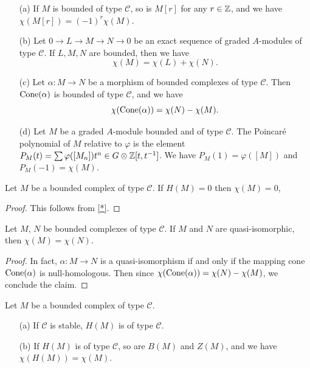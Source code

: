 \begin{example}
\mbox{}
\begin{itemize}
\item[(a)] If $M$ is bounded of type $\mathscr{C}$, so is $M[r]$ for any $r\in\mathbb{Z}$, and we have $\chi(M[r])=(-1)^r\chi(M)$.
\item[(b)] Let $0\to L\to M\to N\to 0$ be an exact sequence of graded $A$-modules of type $\mathscr{C}$. If $L,M,N$ are bounded, then we have
\[\chi(M)=\chi(L)+\chi(N).\] 
\item[(c)] Let $\alpha:M\to N$ be a morphism of bounded complexes of type $\mathscr{C}$. Then $\mathrm{Cone}(\alpha)$ is bounded of type $\mathscr{C}$, and we have
\[\chi(\mathrm{Cone}(\alpha))=\chi(N)-\chi(M).\]
\item[(d)] Let $M$ be a graded $A$-module bounded and of type $\mathscr{C}$. The Poincar\'e polynomial of $M$ relative to $\varphi$ is the element $P_M(t)=\sum\varphi([M_n])t^n\in G\otimes\mathbb{Z}[t,t^{-1}]$. We have $P_M(1)=\varphi([M])$ and $P_M(-1)=\chi(M)$. 
\end{itemize}
\end{example}
\begin{lemma}\label{module complex chi zero if exact}
Let $M$ be a bounded complex of type $\mathscr{C}$. If $H(M)=0$ then $\chi(M)=0$,
\end{lemma}
\begin{proof}
This follows from \cref{*}.
\end{proof}
\begin{proposition}\label{module complex quasi-iso same chi}
Let $M$, $N$ be bounded complexes of type $\mathscr{C}$. If $M$ and $N$ are quasi-isomorphic, then $\chi(M)=\chi(N)$.
\end{proposition}
\begin{proof}
In fact, $\alpha:M\to N$ is a quasi-isomorphism if and only if the mapping cone $\mathrm{Cone}(\alpha)$ is null-homologous. Then since $\chi(\mathrm{Cone}(\alpha))=\chi(N)-\chi(M)$, we conclude the claim.
\end{proof}
\begin{proposition}\label{module complex chi of homology prop}
Let $M$ be a bounded complex of type $\mathscr{C}$.
\begin{itemize}
\item[(a)] If $\mathscr{C}$ is stable, $H(M)$ is of type $\mathscr{C}$.
\item[(b)] If $H(M)$ is of type $\mathscr{C}$, so are $B(M)$ and $Z(M)$, and we have $\chi(H(M))=\chi(M)$.
\end{itemize}
\end{proposition}
